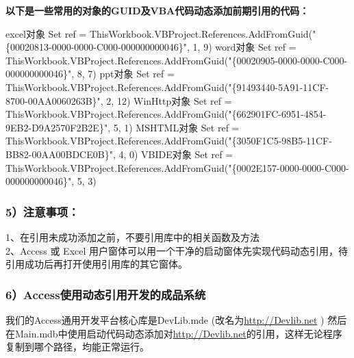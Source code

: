\documentclass[
]{article}
\newenvironment{Shaded}{}{}
\newcommand{\NormalTok}[1]{#1}
\begin{document}
\textbf{以下是一些常用的对象的GUID及VBA代码动态添加前期引用的代码：}

\begin{Shaded}
\begin{Highlighting}[]
\NormalTok{    \textquotesingle{}excel对象}
\NormalTok{    Set ref = ThisWorkbook.VBProject.References.AddFromGuid("\{00020813{-}0000{-}0000{-}C000{-}000000000046\}", 1, 9)}
\NormalTok{    \textquotesingle{}word对象}
\NormalTok{    Set ref = ThisWorkbook.VBProject.References.AddFromGuid("\{00020905{-}0000{-}0000{-}C000{-}000000000046\}", 8, 7)}
\NormalTok{    \textquotesingle{}ppt对象}
\NormalTok{    Set ref = ThisWorkbook.VBProject.References.AddFromGuid("\{91493440{-}5A91{-}11CF{-}8700{-}00AA0060263B\}", 2, 12)}
\NormalTok{    \textquotesingle{}WinHttp对象}
\NormalTok{    Set ref = ThisWorkbook.VBProject.References.AddFromGuid("\{662901FC{-}6951{-}4854{-}9EB2{-}D9A2570F2B2E\}", 5, 1)}
\NormalTok{    \textquotesingle{}MSHTML对象}
\NormalTok{    Set ref = ThisWorkbook.VBProject.References.AddFromGuid("\{3050F1C5{-}98B5{-}11CF{-}BB82{-}00AA00BDCE0B\}", 4, 0)}
\NormalTok{    \textquotesingle{}VBIDE对象}
\NormalTok{    Set ref = ThisWorkbook.VBProject.References.AddFromGuid("\{0002E157{-}0000{-}0000{-}C000{-}000000000046\}", 5, 3)}
\end{Highlighting}
\end{Shaded}

\subsubsection{5）注意事项：}\label{5uxff09ux6ce8ux610fux4e8bux9879}

1、在引用未成功添加之前，不要引用库中的相关函数及方法\\
2、Access 或 Excel
用户窗体可以用一个干净的启动窗体先实现代码动态引用，待引用成功后再打开使用引用库的其它窗体。

\subsubsection{6）Access使用动态引用开发的成品系统}\label{6uxff09accessux4f7fux7528ux52a8ux6001ux5f15ux7528ux5f00ux53d1ux7684ux6210ux54c1ux7cfbux7edf}

我们的Access通用开发平台核心库是DevLib.mde
(改名为\href{https://link.zhihu.com/?target=http\%3A//Devlib.net}{http://Devlib.net}
)
然后在Main.mdb中使用启动代码动态添加对\href{https://link.zhihu.com/?target=http\%3A//Devlib.net}{http://Devlib.net}的引用，这样无论程序复制到哪个路径，均能正常运行。
\end{document}
